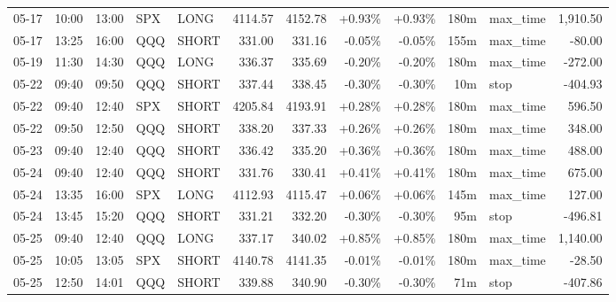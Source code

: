 \documentclass[11pt,a4paper,twoside]{article}
\begin{document}
\begin{center}
\begin{longtable}{>{\color{txtmain}}l l l l l r r r r r >{\color{txtmain}}l r}
05-17 & 10:00 & 13:00 & SPX & LONG & 4114.57 & 4152.78 & \textcolor{wingreen}{+0.93\%} & \textcolor{wingreen}{+0.93\%} & 180m & max\_time & \textcolor{wingreen}{1,910.50} \\
05-17 & 13:25 & 16:00 & QQQ & SHORT & 331.00 & 331.16 & \textcolor{lossred}{-0.05\%} & \textcolor{lossred}{-0.05\%} & 155m & max\_time & \textcolor{lossred}{-80.00} \\
05-19 & 11:30 & 14:30 & QQQ & LONG & 336.37 & 335.69 & \textcolor{lossred}{-0.20\%} & \textcolor{lossred}{-0.20\%} & 180m & max\_time & \textcolor{lossred}{-272.00} \\
05-22 & 09:40 & 09:50 & QQQ & SHORT & 337.44 & 338.45 & \textcolor{lossred}{-0.30\%} & \textcolor{lossred}{-0.30\%} & 10m & stop & \textcolor{lossred}{-404.93} \\
05-22 & 09:40 & 12:40 & SPX & SHORT & 4205.84 & 4193.91 & \textcolor{wingreen}{+0.28\%} & \textcolor{wingreen}{+0.28\%} & 180m & max\_time & \textcolor{wingreen}{596.50} \\
05-22 & 09:50 & 12:50 & QQQ & SHORT & 338.20 & 337.33 & \textcolor{wingreen}{+0.26\%} & \textcolor{wingreen}{+0.26\%} & 180m & max\_time & \textcolor{wingreen}{348.00} \\
05-23 & 09:40 & 12:40 & QQQ & SHORT & 336.42 & 335.20 & \textcolor{wingreen}{+0.36\%} & \textcolor{wingreen}{+0.36\%} & 180m & max\_time & \textcolor{wingreen}{488.00} \\
05-24 & 09:40 & 12:40 & QQQ & SHORT & 331.76 & 330.41 & \textcolor{wingreen}{+0.41\%} & \textcolor{wingreen}{+0.41\%} & 180m & max\_time & \textcolor{wingreen}{675.00} \\
05-24 & 13:35 & 16:00 & SPX & LONG & 4112.93 & 4115.47 & \textcolor{wingreen}{+0.06\%} & \textcolor{wingreen}{+0.06\%} & 145m & max\_time & \textcolor{wingreen}{127.00} \\
05-24 & 13:45 & 15:20 & QQQ & SHORT & 331.21 & 332.20 & \textcolor{lossred}{-0.30\%} & \textcolor{lossred}{-0.30\%} & 95m & stop & \textcolor{lossred}{-496.81} \\
05-25 & 09:40 & 12:40 & QQQ & LONG & 337.17 & 340.02 & \textcolor{wingreen}{+0.85\%} & \textcolor{wingreen}{+0.85\%} & 180m & max\_time & \textcolor{wingreen}{1,140.00} \\
05-25 & 10:05 & 13:05 & SPX & SHORT & 4140.78 & 4141.35 & \textcolor{lossred}{-0.01\%} & \textcolor{lossred}{-0.01\%} & 180m & max\_time & \textcolor{lossred}{-28.50} \\
05-25 & 12:50 & 14:01 & QQQ & SHORT & 339.88 & 340.90 & \textcolor{lossred}{-0.30\%} & \textcolor{lossred}{-0.30\%} & 71m & stop & \textcolor{lossred}{-407.86} \\

\end{longtable}
\end{center}
\end{document}
